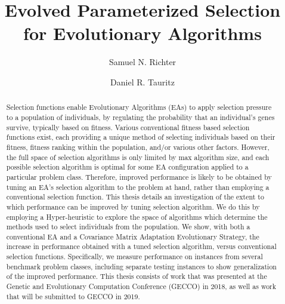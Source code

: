 \documentclass[sigconf]{acmart}
\begin{document}
\title[Evolved Parameterized Selection for Evolutionary Algorithms]{Evolved Parameterized Selection for Evolutionary Algorithms}

\author{Samuel N. Richter}

\author{Daniel R. Tauritz}


\begin{abstract}
Selection functions enable Evolutionary Algorithms (EAs) to apply selection pressure to a population of individuals, by regulating the probability that an individual's genes survive, typically based on fitness. Various conventional fitness based selection functions exist, each providing a unique method of selecting individuals based on their fitness, fitness ranking within the population, and/or various other factors. However, the full space of selection algorithms is only limited by max algorithm size, and each possible selection algorithm is optimal for some EA configuration applied to a particular problem class. Therefore, improved performance is likely to be obtained by tuning an EA's selection algorithm to the problem at hand, rather than employing a conventional selection function. This thesis details an investigation of the extent to which performance can be improved by tuning selection algorithm. We do this by employing a Hyper-heuristic to explore the space of algorithms which determine the methods used to select individuals from the population. We show, with both a conventional EA and a Covariance Matrix Adaptation Evolutionary Strategy, the increase in performance obtained with a tuned selection algorithm, versus conventional selection functions. Specifically, we measure performance on instances from several benchmark problem classes, including separate testing instances to show generalization of the improved performance. This thesis consists of work that was presented at the Genetic and Evolutionary Computation Conference (GECCO) in 2018, as well as work that will be submitted to GECCO in 2019. 

\end{abstract}
\end{document}
